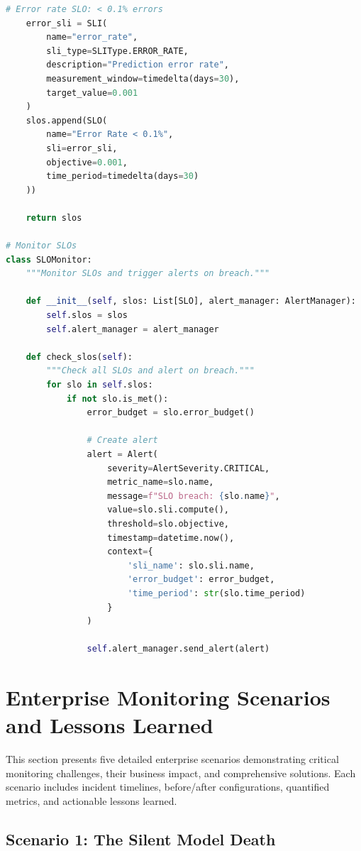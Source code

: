 \begin{lstlisting}[language=Python, caption={SLO/SLI Implementation}]
    # Error rate SLO: < 0.1% errors
    error_sli = SLI(
        name="error_rate",
        sli_type=SLIType.ERROR_RATE,
        description="Prediction error rate",
        measurement_window=timedelta(days=30),
        target_value=0.001
    )
    slos.append(SLO(
        name="Error Rate < 0.1%",
        sli=error_sli,
        objective=0.001,
        time_period=timedelta(days=30)
    ))

    return slos

# Monitor SLOs
class SLOMonitor:
    """Monitor SLOs and trigger alerts on breach."""

    def __init__(self, slos: List[SLO], alert_manager: AlertManager):
        self.slos = slos
        self.alert_manager = alert_manager

    def check_slos(self):
        """Check all SLOs and alert on breach."""
        for slo in self.slos:
            if not slo.is_met():
                error_budget = slo.error_budget()

                # Create alert
                alert = Alert(
                    severity=AlertSeverity.CRITICAL,
                    metric_name=slo.name,
                    message=f"SLO breach: {slo.name}",
                    value=slo.sli.compute(),
                    threshold=slo.objective,
                    timestamp=datetime.now(),
                    context={
                        'sli_name': slo.sli.name,
                        'error_budget': error_budget,
                        'time_period': str(slo.time_period)
                    }
                )

                self.alert_manager.send_alert(alert)
\end{lstlisting}

\section{Enterprise Monitoring Scenarios and Lessons Learned}

This section presents five detailed enterprise scenarios demonstrating critical monitoring challenges, their business impact, and comprehensive solutions. Each scenario includes incident timelines, before/after configurations, quantified metrics, and actionable lessons learned.

\subsection{Scenario 1: The Silent Model Death}

